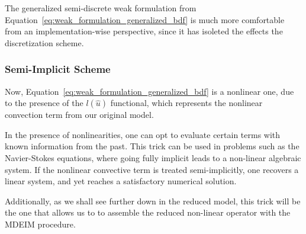 \documentclass[../../thesis.tex]{subfiles}
\begin{document}
The generalized semi-discrete weak formulation from 
Equation~\eqref{eq:weak_formulation_generalized_bdf} 
is much more comfortable from an implementation-wise perspective,
since it has isoleted the effects the discretization scheme.

\subsubsection{Semi-Implicit Scheme}
Now, Equation~\eqref{eq:weak_formulation_generalized_bdf}
is a nonlinear one, due to the presence of the $l(\hat{u})$ functional,
which represents the nonlinear convection term from our original model.

In the presence of nonlinearities, one can opt to evaluate certain terms 
with known information from the past.
This trick can be used in problems such as the Navier-Stokes equations, 
where going fully implicit leads to a non-linear algebraic system. 
If the nonlinear convective term is treated semi-implicitly, 
one recovers a linear system, and yet reaches a satisfactory numerical solution.

Additionally, as we shall see further down in the reduced model, 
this trick will be the one that allows us to 
to assemble the reduced non-linear operator with the MDEIM procedure.

\end{document}
